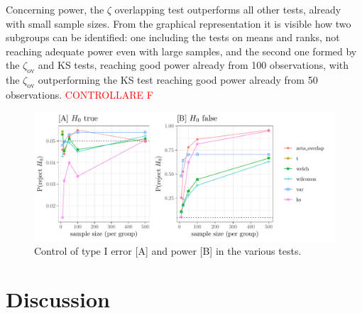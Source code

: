 \documentclass[twocolumn]{article}\usepackage[]{graphicx}\usepackage[]{xcolor}
\makeatletter
\def\maxwidth{ %
  \ifdim\Gin@nat@width>\linewidth
    \linewidth
  \else
    \Gin@nat@width
  \fi
}
\newenvironment{knitrout}{}{} %
\makeatother
\begin{document}
Concerning power, the $\zeta$ overlapping test outperforms all other tests, already with small sample sizes. From the graphical representation it is visible how two subgroups can be identified: one including the tests on means and ranks, not reaching adequate power even with large samples, and the second one formed by the $\zeta_{\mbox{ov}}$ and KS tests, reaching good power already from 100 observations, with the $\zeta_{\mbox{ov}}$ outperforming the KS test reaching good power already from 50 observations.
\textcolor{red}{CONTROLLARE F}


\begin{figure}[!h]
\begin{knitrout}
\color{fgcolor}

{\centering \includegraphics[width=\maxwidth]{figure/global-1} 

}


\end{knitrout}
\caption{Control of type I error [A] and power [B] in the various tests.\label{fig:global}}
\end{figure}



\section{Discussion}

% 
% 
\end{document}
